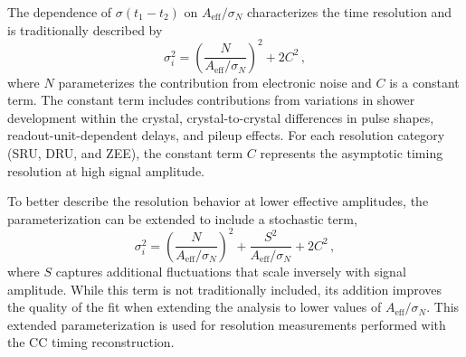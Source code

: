 The dependence of $\sigma(t_{1}-t_{2})$ on $A_{\mathrm{eff}}/\sigma_{N}$ characterizes the time resolution and is traditionally described by
\begin{equation}
\sigma^{2}_{i} =
\left(\frac{N}{A_{\mathrm{eff}}/\sigma_{N}}\right)^{2} + 2C^{2} \, ,
\label{eq_b}
\end{equation}
where $N$ parameterizes the contribution from electronic noise and $C$ is a constant term.
The constant term includes contributions from variations in shower development within the crystal, crystal-to-crystal differences in pulse shapes, readout-unit-dependent delays, and pileup effects.
For each resolution category (SRU, DRU, and ZEE), the constant term $C$ represents the asymptotic timing resolution at high signal amplitude.

To better describe the resolution behavior at lower effective amplitudes, the parameterization can be extended to include a stochastic term,
\begin{equation}
\sigma^{2}_{i} =
\left(\frac{N}{A_{\mathrm{eff}}/\sigma_{N}}\right)^{2}
+ \frac{S^{2}}{A_{\mathrm{eff}}/\sigma_{N}}
+ 2C^{2} \, ,
\label{eq_c}
\end{equation}
where $S$ captures additional fluctuations that scale inversely with signal amplitude.
While this term is not traditionally included, its addition improves the quality of the fit when extending the analysis to lower values of $A_{\mathrm{eff}}/\sigma_{N}$.
This extended parameterization is used for resolution measurements performed with the CC timing reconstruction.

